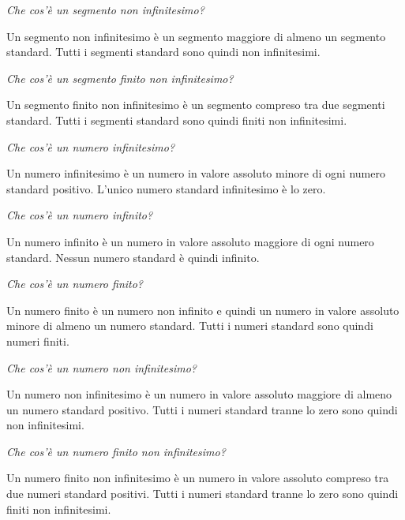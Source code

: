 \begin{esercizio}\label{ese:iper_006} 
\emph{Che cos'è un segmento non infinitesimo?}

Un segmento non infinitesimo è un segmento maggiore di almeno un segmento 
standard. Tutti i segmenti standard sono quindi non infinitesimi.
\end{esercizio}

\begin{esercizio}\label{ese:iper_007} 
\emph{Che cos'è un segmento finito non infinitesimo?}

Un segmento finito non infinitesimo è un segmento compreso tra due segmenti 
standard. Tutti i segmenti standard sono quindi finiti non infinitesimi.
\end{esercizio}

\begin{esercizio}\label{ese:iper_008} 
\emph{Che cos'è un numero infinitesimo?}

Un numero infinitesimo è un numero in valore assoluto minore di ogni numero 
standard positivo. L'unico numero standard infinitesimo è lo zero.
\end{esercizio}

\begin{esercizio}\label{ese:iper_009} 
\emph{Che cos'è un numero infinito?}

Un numero infinito è un numero in valore assoluto maggiore di ogni numero 
standard. Nessun numero standard è quindi infinito.
\end{esercizio}

\begin{esercizio}\label{ese:iper_010} 
\emph{Che cos'è un numero finito?}

Un numero finito è un numero non infinito e quindi un numero in valore 
assoluto minore di almeno un numero standard. 
Tutti i numeri standard sono quindi numeri finiti.
\end{esercizio}

\begin{esercizio}\label{ese:iper_011} 
\emph{Che cos'è un numero non infinitesimo?}

Un numero non infinitesimo è un numero in valore assoluto maggiore di 
almeno un numero standard positivo. 
Tutti i numeri standard tranne lo zero sono quindi non infinitesimi.
\end{esercizio}

\begin{esercizio}\label{ese:iper_012} 
\emph{Che cos'è un numero finito non infinitesimo?}

Un numero finito non infinitesimo è un numero in valore assoluto compreso 
tra due numeri standard positivi. 
Tutti i numeri standard tranne lo zero sono quindi finiti non infinitesimi.
\end{esercizio}

